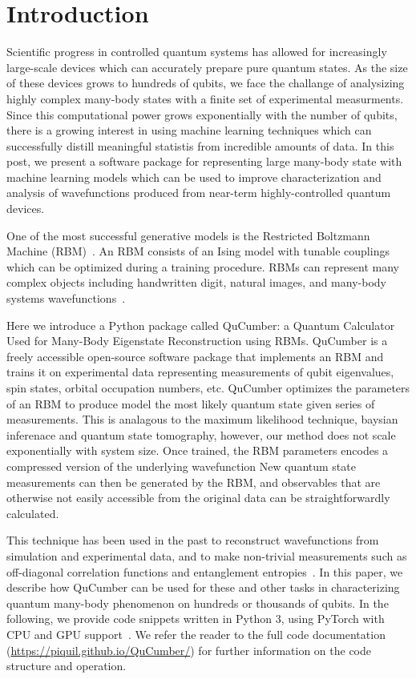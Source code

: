 \documentclass[submission, Phys]{SciPost}
\begin{document}
\section{Introduction}

Scientific progress in controlled quantum systems has allowed for increasingly large-scale devices which can accurately prepare pure quantum states.
As the size of these devices grows to hundreds of qubits, we face the challange of analysizing highly complex many-body states with a finite set of experimental measurments.
Since this computational power grows exponentially with the number of qubits, there is a growing interest in using machine learning techniques which can successfully distill meaningful statistis from incredible amounts of data.
In this post, we present a software package for representing large many-body state with machine learning models which can be used to improve characterization and analysis of wavefunctions produced from near-term highly-controlled quantum devices.

One of the most successful generative models is the Restricted Boltzmann Machine (RBM)~\cite{Smolensky}.
An RBM consists of an Ising model with tunable couplings which can be optimized during a training procedure.
RBMs can represent many complex objects including handwritten digit, natural images, and many-body systems wavefunctions~\cite{Torlai2016thermo, torlai2018tomography, CarleoTroyer2017Science,ChenWang2018,GlasserCirac2018}.

Here we introduce a Python package called QuCumber: a Quantum Calculator Used for Many-Body Eigenstate Reconstruction using RBMs.
QuCumber is a freely accessible open-source software package that implements an RBM and trains it on experimental data representing measurements of qubit eigenvalues, spin states, orbital occupation numbers, etc.
QuCumber optimizes the parameters of an RBM to produce model the most likely quantum state given series of measurements.
This is analagous to the maximum likelihood technique, baysian inferenace and quantum state tomography,
however, our method does not scale exponentially with system size.
Once trained, the RBM parameters encodes a compressed version of the underlying wavefunction
New quantum state measurements can then be generated by the RBM, and observables that are otherwise not easily accessible from the original data can be straightforwardly calculated.

This technique has been used in the past to reconstruct wavefunctions from simulation and experimental data, and to make non-trivial measurements such as off-diagonal correlation functions and entanglement entropies~\cite{Torlai2016thermo, torlai2018tomography}.
In this paper, we describe how QuCumber can be used for these and other tasks in characterizing quantum many-body phenomenon on hundreds or thousands of qubits.
In the following, we provide code snippets written in Python 3, using PyTorch with CPU and GPU support~\cite{paszke2018automativ}.
We refer the reader to the full code documentation (\url{https://piquil.github.io/QuCumber/}) for further information on the code structure and operation.
\end{document}
